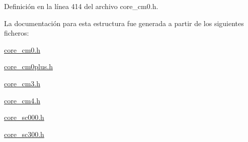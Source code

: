 Definición en la línea 414 del archivo core\+\_\+cm0.\+h.



La documentación para esta estructura fue generada a partir de los siguientes ficheros\+:\begin{DoxyCompactItemize}
\item 
\hyperlink{core__cm0_8h}{core\+\_\+cm0.\+h}\item 
\hyperlink{core__cm0plus_8h}{core\+\_\+cm0plus.\+h}\item 
\hyperlink{core__cm3_8h}{core\+\_\+cm3.\+h}\item 
\hyperlink{core__cm4_8h}{core\+\_\+cm4.\+h}\item 
\hyperlink{core__sc000_8h}{core\+\_\+sc000.\+h}\item 
\hyperlink{core__sc300_8h}{core\+\_\+sc300.\+h}\end{DoxyCompactItemize}
